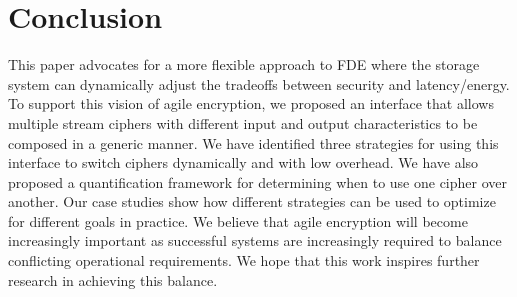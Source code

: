 \section{Conclusion} \label{sec:conclusion}

This paper advocates for a more flexible approach to FDE where the storage
system can dynamically adjust the tradeoffs between security and latency/energy.
To support this vision of agile encryption, we proposed an interface that allows
multiple stream ciphers with different input and output characteristics to be
composed in a generic manner. We have identified three strategies for using this
interface to switch ciphers dynamically and with low overhead. We have also
proposed a quantification framework for determining when to use one cipher over
another. Our case studies show how different strategies can be used to optimize
for different goals in practice. We believe that agile encryption will become
increasingly important as successful systems are increasingly required to
balance conflicting operational requirements. We hope that this work inspires
further research in achieving this balance.
